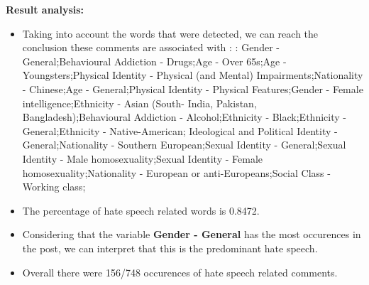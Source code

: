 \documentclass[11pt]{article}
\begin{document}
\textbf{\Large Result analysis:}

\begin{itemize}\item Taking into account the words that were detected, we can reach the conclusion these comments are associated with : : Gender - General;Behavioural Addiction - Drugs;Age - Over 65s;Age - Youngsters;Physical Identity - Physical (and Mental) Impairments;Nationality - Chinese;Age - General;Physical Identity - Physical Features;Gender - Female intelligence;Ethnicity - Asian (South- India, Pakistan, Bangladesh);Behavioural Addiction - Alcohol;Ethnicity - Black;Ethnicity - General;Ethnicity - Native-American; Ideological and Political Identity - General;Nationality - Southern European;Sexual Identity - General;Sexual Identity - Male homosexuality;Sexual Identity - Female homosexuality;Nationality - European or anti-Europeans;Social Class - Working class;%

\item The percentage of hate speech related words is 0.8472.

\item Considering that the variable \textbf{Gender - General} has the most occurences in the post, we can interpret that this is the predominant hate speech.

\item Overall there were 156/748 occurences of hate speech related comments.\end{itemize}
\end{document}

